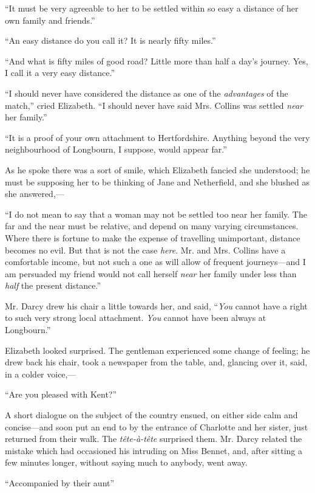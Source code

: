 \documentclass[12pt,openright]{book}
\begin{document}
“It must be very agreeable to her to be settled within so easy a distance of her own family and friends.”

“An easy distance do you call it? It is nearly fifty miles.”

“And what is fifty miles of good road? Little more than half a day’s journey. Yes, I call it a very easy distance.”

“I should never have considered the distance as one of the \textit{advantages} of the match,” cried Elizabeth. “I should never have said Mrs. Collins was settled \textit{near} her family.”

“It is a proof of your own attachment to Hertfordshire. Anything beyond the very neighbourhood of Longbourn, I suppose, would appear far.”

As he spoke there was a sort of smile, which Elizabeth fancied she understood; he must be supposing her to be thinking of Jane and Netherfield, and she blushed as she answered,—

“I do not mean to say that a woman may not be settled too near her family. The far and the near must be relative, and depend on many varying circumstances. Where there is fortune to make the expense of travelling unimportant, distance becomes no evil. But that is not the case \textit{here}. Mr. and Mrs. Collins have a comfortable income, but not such a one as will allow of frequent journeys—and I am persuaded my friend would not call herself \textit{near} her family under less than \textit{half} the present distance.”

Mr. Darcy drew his chair a little towards her, and said, “\textit{You} cannot have a right to such very strong local attachment. \textit{You} cannot have been always at Longbourn.”

Elizabeth looked surprised. The gentleman experienced some change of feeling; he drew back his chair, took a newspaper from the table, and, glancing over it, said, in a colder voice,—

“Are you pleased with Kent?”

A short dialogue on the subject of the country ensued, on either side calm and concise—and soon put an end to by the entrance of Charlotte and her sister, just returned from their walk. The \textit{tête-à-tête} surprised them. Mr. Darcy related the mistake which had occasioned his intruding on Miss Bennet, and, after sitting a few minutes longer, without saying much to anybody, went away.

“Accompanied by their aunt”
\end{document}
